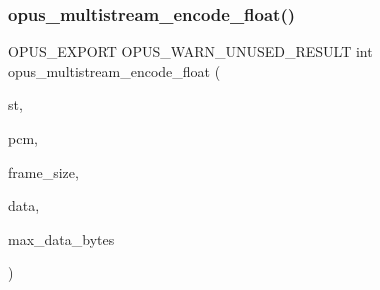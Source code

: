 \subsubsection{\texorpdfstring{opus\_multistream\_encode\_float()}{opus\_multistream\_encode\_float()}}
{\footnotesize\ttfamily O\+P\+U\+S\+\_\+\+E\+X\+P\+O\+RT O\+P\+U\+S\+\_\+\+W\+A\+R\+N\+\_\+\+U\+N\+U\+S\+E\+D\+\_\+\+R\+E\+S\+U\+LT int opus\+\_\+multistream\+\_\+encode\+\_\+float (\begin{DoxyParamCaption}\item[{\mbox{\hyperlink{group__opus__multistream_gae5826674d142fc873ebc1d781c507dd7}{Opus\+M\+S\+Encoder}} $\ast$}]{st,  }\item[{const float $\ast$}]{pcm,  }\item[{int}]{frame\+\_\+size,  }\item[{unsigned char $\ast$}]{data,  }\item[{\mbox{\hyperlink{opus__types_8h_aa4d309d6f80b99dbabebc8f98879ab9a}{opus\+\_\+int32}}}]{max\+\_\+data\+\_\+bytes }\end{DoxyParamCaption})}

